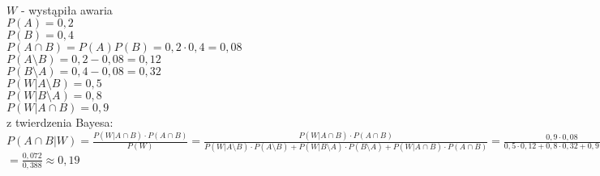 \medskip
{} 
\medskip
\\
$W$ - wystąpiła awaria\\
$P(A) = 0,2$\\
$P(B) = 0,4$ \\
$P(A \cap B) = P(A)P(B) = 0,2 \cdot 0,4 = 0,08$\\
$P(A \setminus B) = 0,2 - 0,08 = 0,12$\\
$P(B \setminus A) = 0,4 - 0,08 = 0,32$\\
$P(W | A \setminus B) = 0,5$\\
$P(W | B \setminus A) = 0,8$\\
$P(W | A \cap B) = 0,9$\\
z twierdzenia Bayesa:\\
$P(A \cap B | W) = \frac{P(W | A \cap B) \cdot P(A \cap B)}{P(W)}= \frac{P(W | A \cap B) \cdot P(A \cap B)}{P(W | A \setminus B) \cdot P(A \setminus B) + P(W | B \setminus A) \cdot P(B \setminus A)+ P(W | A \cap B) \cdot P(A \cap B)} = \frac{0,9 \cdot 0,08}{0,5 \cdot 0,12 + 0,8 \cdot 0,32+ 0,9 \cdot 0,08}=$\\
$=\frac{0,072}{0,388} \approx 0,19$
